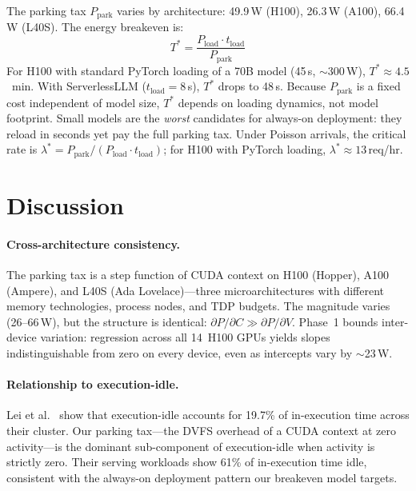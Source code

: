 \documentclass[sigconf,nonacm]{acmart}
\begin{document}
The parking tax $P_{\text{park}}$ varies by architecture: 49.9\,W (H100), 26.3\,W (A100), 66.4\,W (L40S). The energy breakeven is:
\begin{equation}
    T^* = \frac{P_{\text{load}} \cdot t_{\text{load}}}{P_{\text{park}}}
    \label{eq:breakeven}
\end{equation}
For H100 with standard PyTorch loading of a 70B model (45\,s, $\sim$300\,W), $T^* \approx 4.5$~min. With ServerlessLLM ($t_{\text{load}} = 8$\,s), $T^*$ drops to 48\,s. Because $P_{\text{park}}$ is a fixed cost independent of model size, $T^*$ depends on loading dynamics, not model footprint. Small models are the \emph{worst} candidates for always-on deployment: they reload in seconds yet pay the full parking tax. Under Poisson arrivals, the critical rate is $\lambda^* = P_{\text{park}} / (P_{\text{load}} \cdot t_{\text{load}})$; for H100 with PyTorch loading, $\lambda^* \approx 13$\,req/hr.

\section{Discussion}

\paragraph{Cross-architecture consistency.} The parking tax is a step function of CUDA context on H100 (Hopper), A100 (Ampere), and L40S (Ada Lovelace)---three microarchitectures with different memory technologies, process nodes, and TDP budgets. The magnitude varies (26--66\,W), but the structure is identical: $\partial P / \partial C \gg \partial P / \partial V$. Phase~1 bounds inter-device variation: regression across all 14~H100 GPUs yields slopes indistinguishable from zero on every device, even as intercepts vary by $\sim$23\,W.

\paragraph{Relationship to execution-idle.} Lei et al.~\cite{lei-idle} show that execution-idle accounts for 19.7\% of in-execution time across their cluster. Our parking tax---the DVFS overhead of a CUDA context at zero activity---is the dominant sub-component of execution-idle when activity is strictly zero. Their serving workloads show 61\% of in-execution time idle, consistent with the always-on deployment pattern our breakeven model targets.
\end{document}
